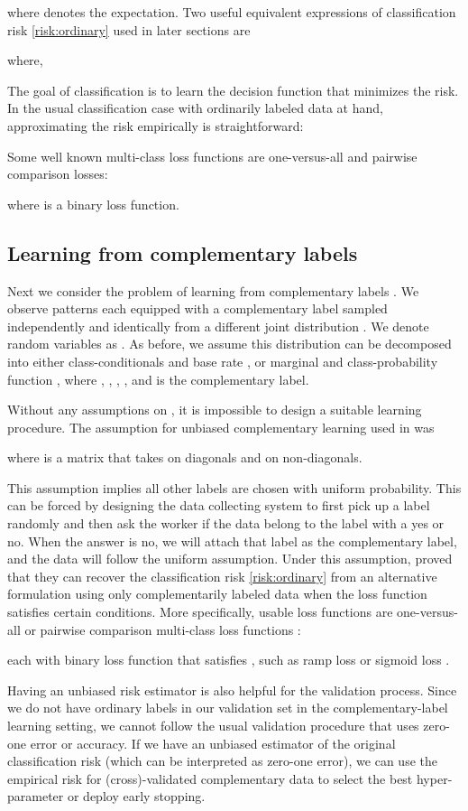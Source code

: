 \documentclass{article}
\begin{document}
where  denotes the expectation.  Two useful equivalent expressions of classification risk \eqref{risk:ordinary} used in later sections are

where,

The goal of classification is to learn the decision function  that minimizes the risk.  In the usual classification case with ordinarily labeled data at hand, approximating the risk empirically is straightforward:

Some well known multi-class loss functions are one-versus-all and pairwise comparison losses:

where  is a binary loss function.
\subsection{Learning from complementary labels}
Next we consider the problem of learning from complementary labels \citep{ishida17nips}.  We observe patterns each equipped with a complementary label  sampled independently and identically from a different joint distribution .  We denote random variables as .
As before, we assume this distribution can be decomposed into either class-conditionals  and base rate , or marginal  and class-probability function , where , , , , and  is the complementary label.

Without any assumptions on , it is impossible to design a suitable learning procedure.
The assumption for unbiased complementary learning used in \citet{ishida17nips} was


where  is a matrix that takes  on diagonals and  on non-diagonals.

This assumption implies all other labels are chosen with uniform probability.  This can be forced by designing the data collecting system to first pick up a label randomly and then ask the worker if the data belong to the label with a yes or no.  When the answer is no, we will attach that label as the complementary label, and the data will follow the uniform assumption.
Under this assumption, \citet{ishida17nips} proved that they can recover the classification risk \eqref{risk:ordinary} from an alternative formulation using only complementarily labeled data when the loss function satisfies certain conditions.
More specifically, usable loss functions are one-versus-all or pairwise comparison multi-class loss functions \citep{ova}:

each with binary loss function  that satisfies , such as ramp loss  or sigmoid loss .

Having an unbiased risk estimator is also helpful for the validation process.  Since we do not have ordinary labels in our validation set in the complementary-label learning setting, we cannot follow the usual validation procedure that uses zero-one error or accuracy.  If we have an unbiased estimator of the original classification risk (which can be interpreted as zero-one error), we can use the empirical risk for (cross)-validated complementary data to select the best hyper-parameter or deploy early stopping.
\end{document}
